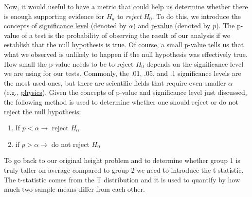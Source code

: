 \documentclass[
  letterpaper,
  DIV=11,
  numbers=noendperiod]{scrartcl}
\providecommand{\tightlist}{%
  \setlength{\itemsep}{0pt}\setlength{\parskip}{0pt}}\usepackage{longtable,booktabs,array}
\begin{document}
Now, it would useful to have a metric that could help us determine
whether there is enough supporting evidence for \(H_a\) to \emph{reject}
\(H_0\). To do this, we introduce the concepts of
\href{https://en.wikipedia.org/wiki/Statistical_significance}{significance
level} (denoted by \(\alpha\)) and
\href{https://www.scribbr.com/statistics/p-value/\#:~:text=A\%20p\%2Dvalue\%2C\%20or\%20probability,to\%20perform\%20your\%20statistical\%20test.}{p-value}
(denoted by \(p\)). The p-value of a test is the probability of
observing the result of our analysis if we establish that the null
hypothesis is true. Of course, a small p-value tells us that what we
observed is unlikely to happen if the null hypothesis was effectively
true. How small the p-value needs to be to reject \(H_0\) depends on the
significance level we are using for our tests. Commonly, the .01, .05,
and .1 significance levels are the most used ones, but there are
scientific fields that require even smaller \(\alpha\) (e.g.,
\href{https://home.cern/resources/faqs/five-sigma}{physics}). Given the
concepts of p-value and significance level just discussed, the following
method is used to determine whether one should reject or do not reject
the null hypothesis:

\begin{tcolorbox}[enhanced jigsaw, bottomrule=.15mm, colframe=quarto-callout-important-color-frame, arc=.35mm, leftrule=.75mm, toptitle=1mm, toprule=.15mm, titlerule=0mm, breakable, opacityback=0, colbacktitle=quarto-callout-important-color!10!white, coltitle=black, bottomtitle=1mm, colback=white, title=\textcolor{quarto-callout-important-color}{\faExclamation}\hspace{0.5em}{Important}, left=2mm, rightrule=.15mm, opacitybacktitle=0.6]

\begin{enumerate}
\def\labelenumi{\arabic{enumi}.}
\tightlist
\item
  If \(p < \alpha \rightarrow\) reject \(H_0\)
\item
  if \(p > \alpha \rightarrow\) do not reject \(H_0\)
\end{enumerate}

\end{tcolorbox}

To go back to our original height problem and to determine whether group
1 is truly taller on average compared to group 2 we need to introduce
the t-statistic. The t-statistic comes from the T distribution and it is
used to quantify by how much two sample means differ from each other.
\end{document}
